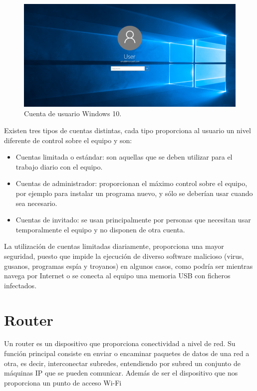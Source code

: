 \documentclass[
  a4paper,
  openany]{book}
\begin{document}
\begin{figure}

{\centering \includegraphics[width=0.75\linewidth]{images/cuenta-usuario-windows-10} 

}

\caption{Cuenta de usuario Windows 10.}\label{fig:unnamed-chunk-9}
\end{figure}

Existen tres tipos de cuentas distintas, cada tipo proporciona al usuario un nivel diferente de control sobre el equipo y son:

\begin{itemize}
\item
  Cuentas limitada o estándar: son aquellas que se deben utilizar para el trabajo diario con el equipo.
\item
  Cuentas de administrador: proporcionan el máximo control sobre el equipo, por ejemplo para instalar un programa nuevo, y sólo se deberían usar cuando sea necesario.
\item
  Cuentas de invitado: se usan principalmente por personas que necesitan usar temporalmente el equipo y no disponen de otra cuenta.
\end{itemize}

La utilización de cuentas limitadas diariamente, proporciona una mayor seguridad, puesto que impide la ejecución de diverso software malicioso (virus, gusanos, programas espía y troyanos) en algunos casos, como podría ser mientras navega por Internet o se conecta al equipo una memoria USB con ficheros infectados.

\hypertarget{router}{%
\section{Router}\label{router}}

Un router es un dispositivo que proporciona conectividad a nivel de red. Su función principal consiste en enviar o encaminar paquetes de datos de una red a otra, es decir, interconectar subredes, entendiendo por subred un conjunto de máquinas IP que se pueden comunicar. Además de ser el dispositivo que nos proporciona un punto de acceso Wi-Fi
\end{document}
